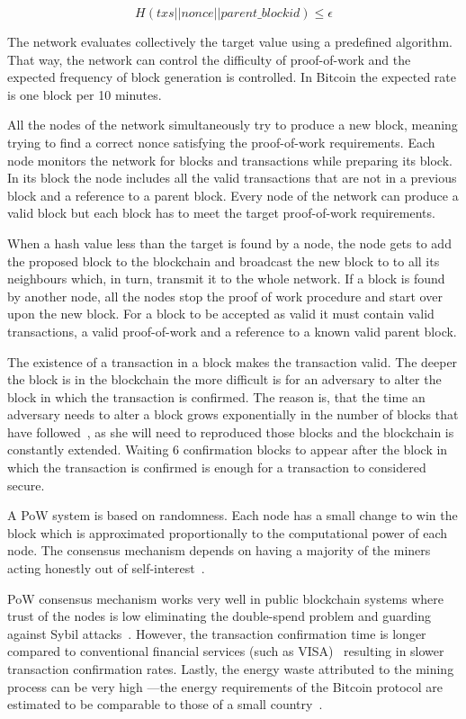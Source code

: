 \begin{equation*}
  H(txs || nonce || parent\_blockid) \leq \epsilon
\end{equation*}

The network evaluates collectively the target value using a predefined algorithm. That way, the network can control the difficulty of proof-of-work and the expected frequency of block generation is controlled. In Bitcoin the expected rate is one block per 10 minutes.

All the nodes of the network simultaneously try to produce a new block, meaning trying to find a correct nonce satisfying the proof-of-work requirements. Each node monitors the network for blocks and transactions while preparing its block. In its block the node includes all the valid transactions that are not in a previous block and a reference to a parent block. Every node of the network can produce a valid block but each block has to meet the target proof-of-work requirements.

When a hash value less than the target is found by a node, the node gets to add the proposed block to the blockchain and broadcast the new block to to all its neighbours which, in turn, transmit it to the whole network. If a block is found by another node, all the nodes stop the proof of work procedure and start over upon the new block. For a block to be accepted as valid it must contain valid transactions, a valid proof-of-work and a reference to a known valid parent block.

The existence of a transaction in a block makes the transaction valid. The deeper the block is in the blockchain the more difficult is for an adversary to alter the block in which the transaction is confirmed. The reason is, that the time an adversary needs to alter a block grows exponentially in the number of blocks that have followed~\cite{10.1007/978-3-662-46803-6_10}, as she will need to reproduced those blocks and the blockchain is constantly extended. Waiting 6 confirmation blocks to appear after the block in which the transaction is confirmed is enough for a transaction to considered secure.

A PoW system is based on randomness. Each node has a small change to win the block which is approximated proportionally to the computational power of each node. The consensus mechanism depends on having a majority of the miners acting honestly out of self-interest~\cite{antonopoulos2014mastering}.

PoW consensus mechanism works very well in public blockchain systems where trust of the nodes is low eliminating the double-spend problem and guarding against Sybil attacks~\cite{Vu:2009:PCP:1671222}. However, the transaction confirmation time is longer compared to conventional financial services (such as VISA)~\cite{Sompolinsky2015,Zohar:2015:BUH:2817191.2701411,DBLP:journals/corr/abs-1708-05665} resulting in slower transaction confirmation rates. Lastly, the energy waste attributed to the mining process can be very high ---the energy requirements of the Bitcoin protocol are estimated to be comparable to those of a small country~\cite{6912770}.

